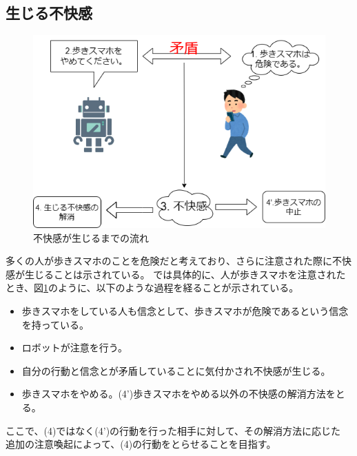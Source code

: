\documentclass[11pt,a4j]{jreport}
\begin{document}
\subsection{生じる不快感}
\label{sec: dissonance}
\begin{figure}[htbp]
  
  \includegraphics[width=13cm]{img/CDT.png}
  \caption{不快感が生じるまでの流れ}
  \label{fig: dissonance}
\end{figure}

多くの人が歩きスマホのことを危険だと考えており、さらに注意された際に不快感が生じることは示されている。
\cite{Schneider2022}では具体的に、人が歩きスマホを注意されたとき、図\ref{fig: dissonance}のように、以下のような過程を経ることが示されている。
\begin{itemize}
  \item[(1)] 歩きスマホをしている人も信念として、歩きスマホが危険であるという信念を持っている。
  \item[(2)] ロボットが注意を行う。
  \item[(3)] 自分の行動と信念とが矛盾していることに気付かされ不快感が生じる。
  \item[(4)] 歩きスマホをやめる。(4')歩きスマホをやめる以外の不快感の解消方法をとる。
  \label{item: dissonance}
\end{itemize}
ここで、(4)ではなく(4')の行動を行った相手に対して、その解消方法に応じた
追加の注意喚起によって、(4)の行動をとらせることを目指す。
\end{document}
